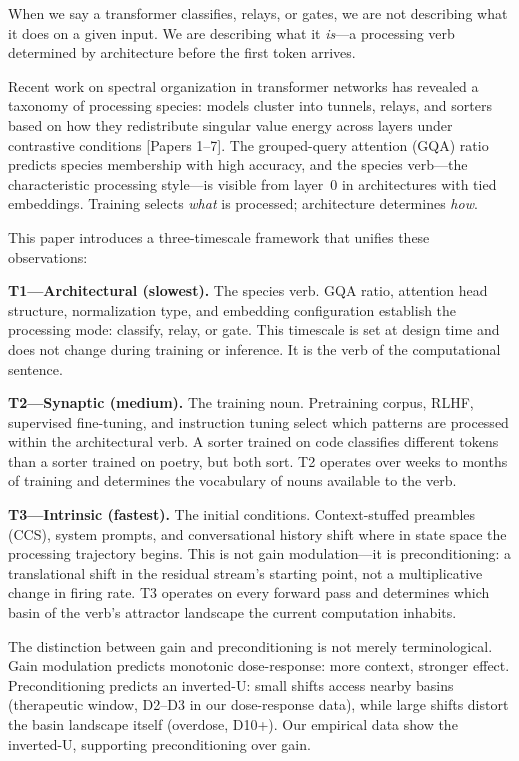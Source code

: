 \documentclass[12pt]{article}
\begin{document}
When we say a transformer classifies, relays, or gates, we are not describing what it does on a given input. We are describing what it \emph{is}---a processing verb determined by architecture before the first token arrives.

Recent work on spectral organization in transformer networks has revealed a taxonomy of processing species: models cluster into tunnels, relays, and sorters based on how they redistribute singular value energy across layers under contrastive conditions [Papers 1--7]. The grouped-query attention (GQA) ratio predicts species membership with high accuracy, and the species verb---the characteristic processing style---is visible from layer~0 in architectures with tied embeddings. Training selects \emph{what} is processed; architecture determines \emph{how}.

This paper introduces a three-timescale framework that unifies these observations:

\textbf{T1---Architectural (slowest).} The species verb. GQA ratio, attention head structure, normalization type, and embedding configuration establish the processing mode: classify, relay, or gate. This timescale is set at design time and does not change during training or inference. It is the verb of the computational sentence.

\textbf{T2---Synaptic (medium).} The training noun. Pretraining corpus, RLHF, supervised fine-tuning, and instruction tuning select which patterns are processed within the architectural verb. A sorter trained on code classifies different tokens than a sorter trained on poetry, but both sort. T2 operates over weeks to months of training and determines the vocabulary of nouns available to the verb.

\textbf{T3---Intrinsic (fastest).} The initial conditions. Context-stuffed preambles (CCS), system prompts, and conversational history shift where in state space the processing trajectory begins. This is not gain modulation---it is preconditioning: a translational shift in the residual stream's starting point, not a multiplicative change in firing rate. T3 operates on every forward pass and determines which basin of the verb's attractor landscape the current computation inhabits.

The distinction between gain and preconditioning is not merely terminological. Gain modulation predicts monotonic dose-response: more context, stronger effect. Preconditioning predicts an inverted-U: small shifts access nearby basins (therapeutic window, D2--D3 in our dose-response data), while large shifts distort the basin landscape itself (overdose, D10+). Our empirical data show the inverted-U, supporting preconditioning over gain.
\end{document}
